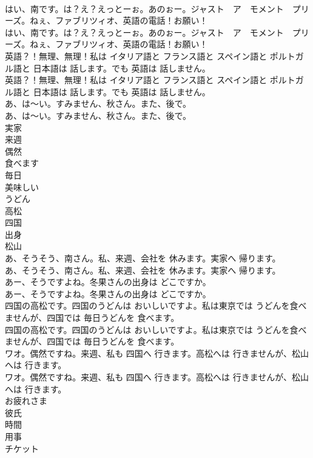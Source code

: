 \documentclass[8pt]{extreport}
\begin{document}
\begin{CJK}{UTF8}{min}
\\	はい、南です。は？え？えっとーぉ。あのぉー。ジャスト　ア　モメント　プリーズ。ねぇ、ファブリツィオ、英語の電話！お願い！	
\\	はい、南です。は？え？えっとーぉ。あのぉー。ジャスト　ア　モメント　プリーズ。ねぇ、ファブリツィオ、英語の電話！お願い！ 
\\	英語？！無理、無理！私は イタリア語と フランス語と スペイン語と ポルトガル語と 日本語は 話します。でも 英語は 話しません。	
\\	英語？！無理、無理！私は イタリア語と フランス語と スペイン語と ポルトガル語と 日本語は 話します。でも 英語は 話しません。 
\\	あ、は～い。すみません、秋さん。また、後で。	
\\	あ、は～い。すみません、秋さん。また、後で。 
\\	実家
\\	来週
\\	偶然
\\	食べます
\\	毎日
\\	美味しい
\\	うどん
\\	高松
\\	四国
\\	出身
\\	松山
\\	あ、そうそう、南さん。私、来週、会社を 休みます。実家へ 帰ります。	
\\	あ、そうそう、南さん。私、来週、会社を 休みます。実家へ 帰ります。 
\\	あー、そうですよね。冬果さんの出身は どこですか。	
\\	あー、そうですよね。冬果さんの出身は どこですか。 
\\	四国の高松です。四国のうどんは おいしいですよ。私は東京では うどんを食べませんが、四国では 毎日うどんを 食べます。	
\\	四国の高松です。四国のうどんは おいしいですよ。私は東京では うどんを食べませんが、四国では 毎日うどんを 食べます。 
\\	ワオ。偶然ですね。来週、私も 四国へ 行きます。高松へは 行きませんが、松山へは 行きます。	
\\	ワオ。偶然ですね。来週、私も 四国へ 行きます。高松へは 行きませんが、松山へは 行きます。 
\\	お疲れさま
\\	彼氏
\\	時間
\\	用事
\\	チケット

\end{CJK}
\end{document}
